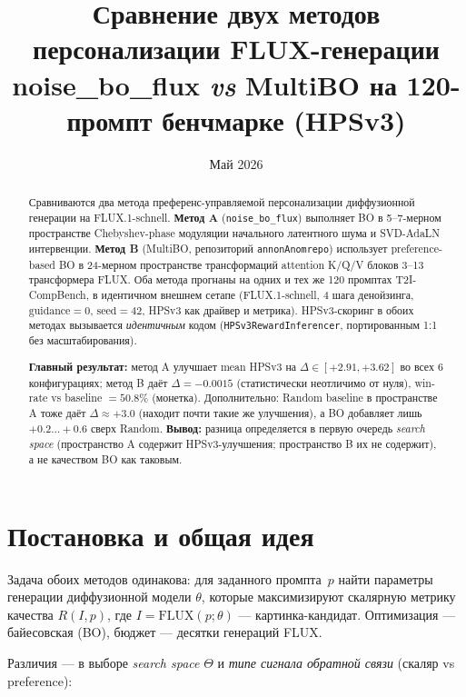\documentclass[11pt,a4paper]{article}
\title{Сравнение двух методов персонализации FLUX-генерации\\
       \large noise\_bo\_flux \emph{vs} MultiBO на 120-промпт бенчмарке (HPSv3)}
\author{}
\date{Май 2026}
\begin{document}
\maketitle

\begin{abstract}
\noindent Сравниваются два метода преференс-управляемой персонализации
диффузионной генерации на FLUX.1-schnell. \textbf{Метод A}
(\texttt{noise\_bo\_flux}) выполняет BO в 5--7-мерном пространстве
Chebyshev-phase модуляции начального латентного шума и SVD-AdaLN
интервенции. \textbf{Метод B} (MultiBO, репозиторий
\texttt{annonAnomrepo}) использует preference-based BO в 24-мерном
пространстве трансформаций attention K/Q/V блоков 3--13 трансформера FLUX.
Оба метода прогнаны на одних и тех же 120 промптах T2I-CompBench, в
идентичном внешнем сетапе (FLUX.1-schnell, 4 шага денойзинга,
$\text{guidance}=0$, $\text{seed}=42$, HPSv3 как драйвер и метрика).
HPSv3-скоринг в обоих методах вызывается \emph{идентичным} кодом
(\texttt{HPSv3RewardInferencer}, портированным 1:1 без масштабирования).

\smallskip
\noindent \textbf{Главный результат:} метод A улучшает mean HPSv3 на
$\Delta \in [+2.91, +3.62]$ во всех 6 конфигурациях; метод B даёт
$\Delta = -0.0015$ (статистически неотличимо от нуля), win-rate vs
baseline $= 50.8\%$ (монетка). Дополнительно: Random baseline в
пространстве A тоже даёт $\Delta \approx +3.0$ (находит почти такие же
улучшения), а BO добавляет лишь $+0.2 \ldots +0.6$ сверх Random.
\textbf{Вывод:} разница определяется в первую очередь \emph{search space}
(пространство A содержит HPSv3-улучшения; пространство B их не содержит),
а не качеством BO как таковым.
\end{abstract}

\tableofcontents

\section{Постановка и общая идея}

Задача обоих методов одинакова: для заданного промпта~$p$ найти параметры
генерации диффузионной модели $\theta$, которые максимизируют скалярную
метрику качества $R(I, p)$, где $I = \mathrm{FLUX}(p; \theta)$ ---
картинка-кандидат. Оптимизация --- байесовская (BO), бюджет --- десятки
генераций FLUX.

Различия --- в выборе \emph{search space} $\Theta$ и \emph{типе сигнала
обратной связи} (скаляр vs preference):
\end{document}
